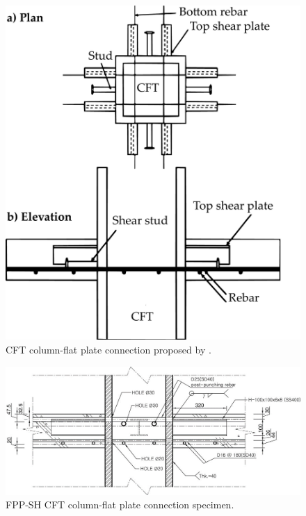 \begin{figure}\centering
    \includegraphics[width=\columnwidth]{Figures/l2005.pdf}
    \caption{CFT column-flat plate connection proposed by \cite{lee2005}.}
    \label{l2005}
    \end{figure}
\begin{figure}\centering
    \includegraphics[width=\columnwidth]{Figures/l2008f2b.png}
    \caption{FPP-SH CFT column-flat plate connection specimen\citep{LEE2008418}.}
    \label{l2008f2b}
    \end{figure}
    
